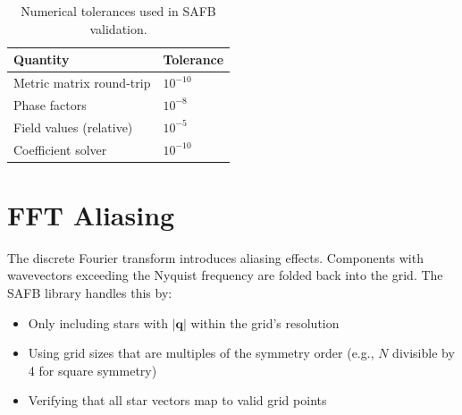 \begin{table}[h]
\centering
\begin{tabular}{ll}
\hline\hline
\textbf{Quantity} & \textbf{Tolerance} \\
\hline
Metric matrix round-trip & $10^{-10}$ \\
Phase factors & $10^{-8}$ \\
Field values (relative) & $10^{-5}$ \\
Coefficient solver & $10^{-10}$ \\
\hline\hline
\end{tabular}
\caption{Numerical tolerances used in SAFB validation.}
\end{table}

\section{FFT Aliasing}

The discrete Fourier transform introduces aliasing effects. Components with wavevectors exceeding the Nyquist frequency are folded back into the grid. The SAFB library handles this by:

\begin{itemize}
    \item Only including stars with $|\boldsymbol{q}|$ within the grid's resolution
    \item Using grid sizes that are multiples of the symmetry order (e.g., $N$ divisible by 4 for square symmetry)
    \item Verifying that all star vectors map to valid grid points
\end{itemize}
